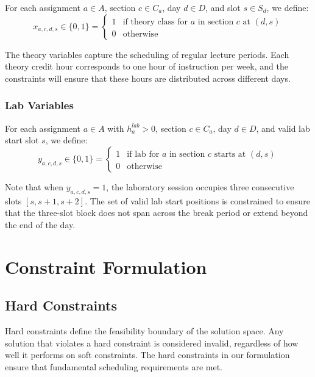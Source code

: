 \documentclass[12pt,a4paper]{article}
\begin{document}
For each assignment $a \in A$, section $c \in C_a$, day $d \in D$, and slot $s \in S_d$, we define:
\begin{equation}
x_{a,c,d,s} \in \{0, 1\} = \begin{cases}
1 & \text{if theory class for } a \text{ in section } c \text{ at } (d,s) \\
0 & \text{otherwise}
\end{cases}
\end{equation}

The theory variables capture the scheduling of regular lecture periods. Each theory credit hour corresponds to one hour of instruction per week, and the constraints will ensure that these hours are distributed across different days.

\subsubsection{Lab Variables}

For each assignment $a \in A$ with $h_a^{lab} > 0$, section $c \in C_a$, day $d \in D$, and valid lab start slot $s$, we define:
\begin{equation}
y_{a,c,d,s} \in \{0, 1\} = \begin{cases}
1 & \text{if lab for } a \text{ in section } c \text{ starts at } (d,s) \\
0 & \text{otherwise}
\end{cases}
\end{equation}

Note that when $y_{a,c,d,s} = 1$, the laboratory session occupies three consecutive slots $[s, s+1, s+2]$. The set of valid lab start positions is constrained to ensure that the three-slot block does not span across the break period or extend beyond the end of the day.

\section{Constraint Formulation}

\subsection{Hard Constraints}

Hard constraints define the feasibility boundary of the solution space. Any solution that violates a hard constraint is considered invalid, regardless of how well it performs on soft constraints. The hard constraints in our formulation ensure that fundamental scheduling requirements are met.
\end{document}

